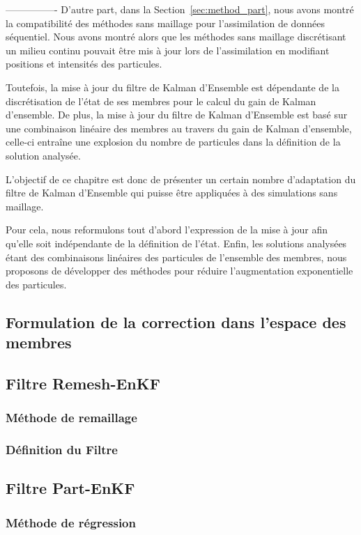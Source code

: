 \begin{itemize}
----------------
D'autre part, dans la Section~\ref{sec:method_part}, nous avons montré la compatibilité des méthodes sans maillage pour l'assimilation de données séquentiel. Nous avons montré alors que les méthodes sans maillage discrétisant un milieu continu pouvait être mis à jour lors de l'assimilation en modifiant positions et intensités des particules.

Toutefois, la mise à jour du filtre de Kalman d'Ensemble est dépendante de la discrétisation de l'état de ses membres pour le calcul du gain de Kalman d'ensemble. De plus, la mise à jour du filtre de Kalman d'Ensemble est basé sur une combinaison linéaire des membres au travers du gain de Kalman d'ensemble, celle-ci entraîne une explosion du nombre de particules dans la définition de la solution analysée.

L'objectif de ce chapitre est donc de présenter un certain nombre d'adaptation du filtre de Kalman d'Ensemble qui puisse être appliquées à des simulations sans maillage.

Pour cela, nous reformulons tout d'abord l'expression de la mise à jour afin qu'elle soit indépendante de la définition de l'état.
Enfin, les solutions analysées étant des combinaisons linéaires des particules de l'ensemble des membres, nous proposons de développer des méthodes pour réduire l'augmentation exponentielle des particules.

\subsection{Formulation de la correction dans l'espace des membres}

\subsection{Filtre Remesh-EnKF}
\subsubsection{Méthode de remaillage}
\subsubsection{Définition du Filtre}
\subsection{Filtre Part-EnKF}
\subsubsection{Méthode de régression}

\end{itemize}
